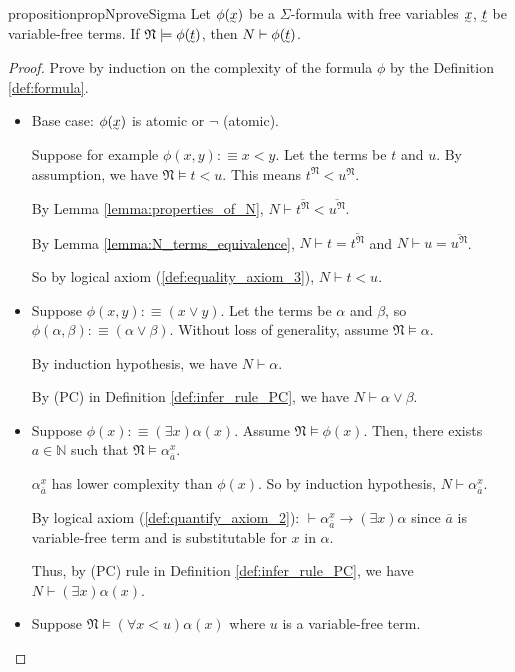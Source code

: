 \documentclass[11pt,letterpaper]{book}
\newcommand{\ut}[1]{\underaccent{\sim}{#1}}
\renewcommand{\vec}[1]{\ut{#1}}
\theoremstyle{definition}
\begin{document}
\begin{restatable}{proposition}{propNproveSigma}\label{proposition:N_prove_all_true_Sigma_formula}
Let $\phi(\vec x )$ be a $\Sigma$-formula with free variables $\vec x$,
 $\vec t$ be variable-free terms. If $\mathfrak{N} \models
\phi(\vec t) $, then $N \vdash \phi (\vec t)$.
\end{restatable}

\begin{proof}
Prove by induction on the complexity of the formula $\phi$ by the Definition \ref{def:formula}.
\begin{itemize}
\item{Base case: $\phi(\vec x)$ is atomic or $\lnot$ (atomic). 

Suppose for example $\phi(x,y): \equiv x < y$. Let the terms be $t$ and $u$. By assumption, we have $\mathfrak{N} \models t < u$. This means $t^{\mathfrak{N}} < u^{\mathfrak{N}}$.

By Lemma \ref{lemma:properties_of_N}, $N \vdash \overline{t^{\mathfrak{N}}} < \overline{u^{\mathfrak{N}}} $.

By Lemma \ref{lemma:N_terms_equivalence}, $N \vdash t = \overline{t^{\mathfrak{N}}}$ and $N \vdash u = \overline{u^{\mathfrak{N}}}$.

So by logical axiom (\ref{def:equality_axiom_3}), $N \vdash t < u$.
}
\item{Suppose $\phi (x, y) : \equiv (x \lor y)  $. Let the terms be $\alpha$ and $\beta$, so $\phi(\alpha, \beta): \equiv (\alpha \lor \beta)$. Without loss of generality, assume $\mathfrak{N} \models \alpha$.

By induction hypothesis, we have $N \vdash \alpha$.

By (PC) in Definition \ref{def:infer_rule_PC}, we have $N \vdash \alpha \lor \beta$.
}
\item{Suppose $\phi(x) :\equiv (\exists x) \alpha (x) $. Assume $\mathfrak{N} \models \phi(x)$. Then, there exists $a \in \mathbb{N}$ such that $\mathfrak{N} \models \alpha_{\overline{a}} ^x$.

$\alpha_{\overline{a}} ^x$ has lower complexity than $\phi(x)$. So by induction hypothesis, $N \vdash \alpha_{\overline{a}} ^x$.

By logical axiom (\ref{def:quantify_axiom_2}): $\vdash \alpha_{\overline{a}} ^x \rightarrow (\exists x) \alpha $ since $\overline{a}$ is variable-free term and is substitutable for $x$ in $\alpha$.

Thus, by (PC) rule in Definition \ref{def:infer_rule_PC}, we have $N \vdash (\exists x) \alpha (x)$.
}
\item{Suppose $\mathfrak{N} \models (\forall x < u) \alpha (x)$ where $u$ is a variable-free term.

}
\end{itemize}
\end{proof}
\end{document}
